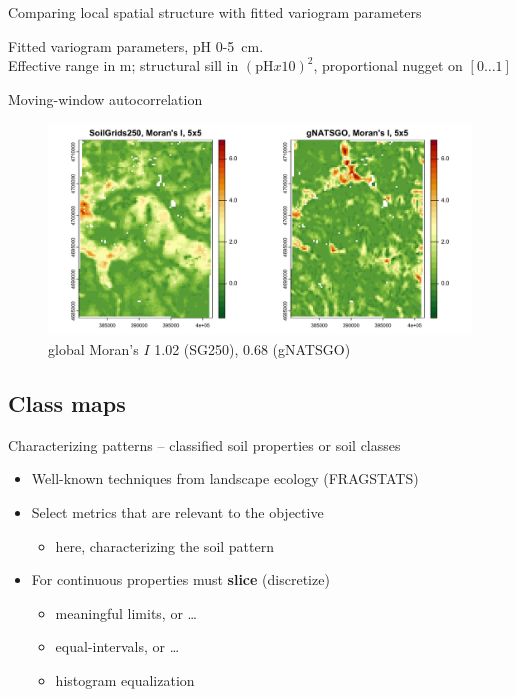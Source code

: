 \documentclass[aspectratio=169]{beamer}
\begin{document}
\begin{frame}{Comparing local spatial structure with fitted variogram parameters}



\par
Fitted variogram parameters, pH 0-5~cm.
\\
Effective range in m; structural sill in $(\mathrm{pH}x10)^2$, proportional nugget on $[0 \ldots 1]$    
\end{frame}

\begin{frame}{Moving-window autocorrelation}
    \begin{figure}
        \centering
        \includegraphics[height=0.7\textheight]{./graphics_david/moving-window-5-1.png}
        \\global Moran's $I$ 1.02 (SG250), 0.68 (gNATSGO)
    \end{figure}
\end{frame}

\subsection{Class maps}

\begin{frame}{Characterizing patterns -- classified soil properties or soil classes}
\begin{itemize}
    \item Well-known techniques from landscape ecology (FRAGSTATS)
    \item Select metrics that are relevant to the objective
    \begin{itemize}
        \item here, characterizing the soil pattern
    \end{itemize}
    \item For continuous properties must \textbf{slice} (discretize)
    \begin{itemize}
        \item meaningful limits, or \ldots
        \item equal-intervals, or \ldots
        \item histogram equalization
    \end{itemize}
\end{itemize}
\end{frame}
\end{document}
